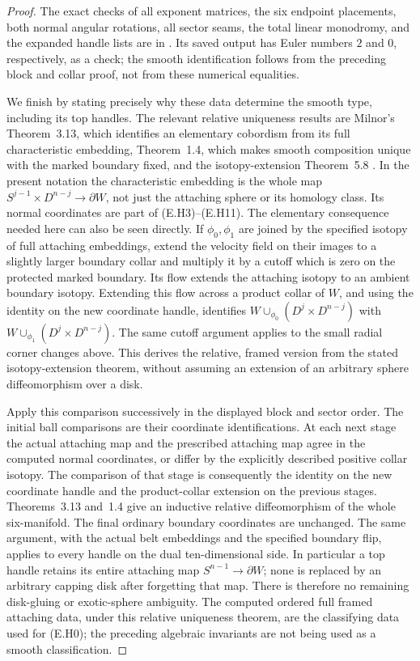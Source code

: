 \begin{proof}
The exact checks of all exponent matrices, the six endpoint
placements, both normal angular rotations, all sector seams,
the total linear monodromy, and the expanded handle lists
are in .  Its saved output
has Euler numbers $2$ and $0$, respectively, as a check;
the smooth identification follows from the preceding block
and collar proof, not from these numerical equalities.

We finish by stating precisely why these data determine the smooth
type, including its top handles.  The relevant relative uniqueness
results are Milnor's Theorem~3.13, which identifies an elementary
cobordism from its full characteristic embedding, Theorem~1.4,
which makes smooth composition unique with the marked boundary
fixed, and the isotopy-extension Theorem~5.8
\cite{mapsMilnor65}.  In the present notation the characteristic
embedding is the whole map
$S^{j-1}\times D^{n-j}\longrightarrow\partial W$, not just
the attaching sphere or its homology class.  Its normal coordinates
are part of (E.H3)--(E.H11).  The elementary consequence needed
here can also be seen directly.  If $\phi_0,\phi_1$ are joined
by the specified isotopy of full attaching embeddings, extend
the velocity field on their images to a slightly larger boundary
collar and multiply it by a cutoff which is zero on the protected
marked boundary.  Its flow extends the attaching isotopy to an
ambient boundary isotopy.  Extending this flow across a product
collar of $W$, and using the identity on the new coordinate handle,
identifies $W\cup_{\phi_0}(D^j\times D^{n-j})$ with
$W\cup_{\phi_1}(D^j\times D^{n-j})$.  The same cutoff argument
applies to the small radial corner changes above.  This derives
the relative, framed version from the stated isotopy-extension
theorem, without assuming an extension of an arbitrary sphere
diffeomorphism over a disk.

Apply this comparison successively in the displayed block and
sector order.  The initial ball comparisons are their coordinate
identifications.  At each next stage the actual attaching map
and the prescribed attaching map agree in the computed normal
coordinates, or differ by the explicitly described positive
collar isotopy.  The comparison of that stage is consequently
the identity on the new coordinate handle and the product-collar
extension on the previous stages.  Theorems~3.13 and~1.4 give an
inductive relative diffeomorphism of the whole six-manifold.
The final ordinary boundary coordinates are unchanged.  The
same argument, with the actual belt embeddings and the specified
boundary flip, applies to every handle on the dual ten-dimensional
side.  In particular a top handle retains its entire attaching
map $S^{n-1}\to\partial W$; none is replaced by an arbitrary
capping disk after forgetting that map.  There is therefore no
remaining disk-gluing or exotic-sphere ambiguity.  The computed
ordered full framed attaching data, under this relative uniqueness
theorem, are the classifying data used for (E.H0); the preceding
algebraic invariants are not being used as a smooth classification.
\end{proof}
